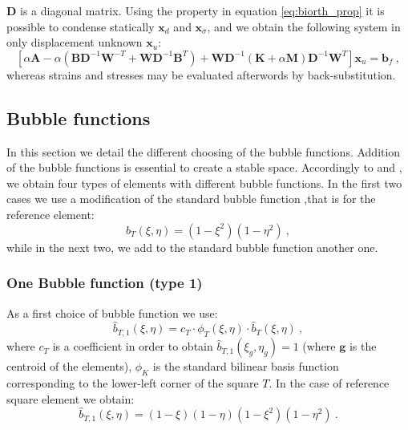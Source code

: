 \documentclass[preprint,12pt,authoryear]{elsarticle}
\begin{document}
$\bm{D}$ is a diagonal matrix.
Using the property in equation \eqref{eq:biorth_prop} it is possible to condense statically $\bm{x}_{d}$ and $\bm{x}_{\sigma}$, and we obtain the following system in only displacement unknown 
$\bm{x}_{u}$:
\begin{equation}
\left[ \alpha \bm{A} - \alpha \left( \bm{B} \bm{D}^{-1} \bm{W}^{-T} 
+ \bm{W} \bm{D}^{-1} \bm{B}^{T} \right) + 
\bm{W} \bm{D}^{-1} \left( \bm{K} + \alpha \bm{M} \right) 
\bm{D}^{-1} \bm{W}^{T} \right] \bm{x}_{u} = \bm{b}_{f}\:,
\end{equation}
whereas strains and stresses may be evaluated afterwords by back-substitution.

\subsection{Bubble functions}
In this section we detail the different choosing of the bubble functions. Addition of the bubble functions is essential to create a stable space.
Accordingly to \cite{bai} and \cite{lamichhane}, we obtain four types of elements with different bubble functions.
In the first two cases we use a modification of the standard bubble function ,that is for the reference element:
\begin{equation}\label{eq:standard_bubble_fun}
\hat{b}_{T}(\xi,\eta) = (1-\xi^{2})(1-\eta^{2})\:,
\end{equation}
while in the next two, we add to the standard bubble function another one.

\subsubsection{One Bubble function (type 1)}
As a first choice of bubble function we use:
\begin{equation}\label{eq:bubble_1}
\hat{b}_{T,1}(\xi,\eta) = c_{T}\cdot\phi_{T}(\xi,\eta)\cdot \hat{b}_{T}(\xi,\eta)\:, 
\end{equation}
where $c_{T}$ is a coefficient in order to obtain $\hat{b}_{T,1}(\xi_{g},\eta_{g}) = 1$ (where $\bm{g}$ is the centroid of the elements), $\phi_{K}$ is the standard bilinear basis function corresponding to the lower-left corner of the square $T$.
In the case of reference square element we obtain:
\begin{equation} \label{eq:bubble_1_ref}
\hat{b}_{T,1}(\xi,\eta) = (1-\xi)(1-\eta)(1-\xi^{2})(1-\eta^{2})\:.
\end{equation}
\end{document}
